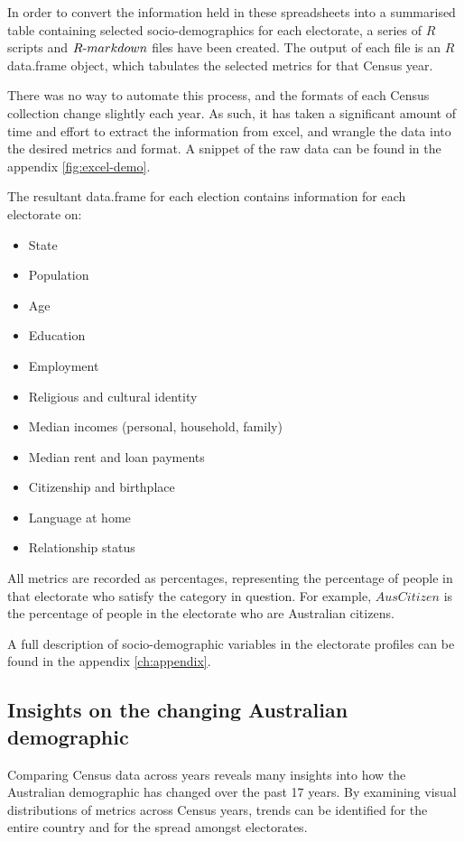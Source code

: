 \documentclass{monashthesis}
\theoremstyle{definition}
\theoremstyle{definition}
\theoremstyle{definition}
\theoremstyle{remark}
\begin{document}
In order to convert the information held in these spreadsheets into a
summarised table containing selected socio-demographics for each
electorate, a series of \(R\) scripts and \(R{\text -}markdown\) files
have been created. The output of each file is an \(R\) data.frame
object, which tabulates the selected metrics for that Census year.

There was no way to automate this process, and the formats of each
Census collection change slightly each year. As such, it has taken a
significant amount of time and effort to extract the information from
excel, and wrangle the data into the desired metrics and format. A
snippet of the raw data can be found in the appendix
\ref{fig:excel-demo}.

The resultant data.frame for each election contains information for each
electorate on:

\begin{itemize}
\item
  State
\item
  Population
\item
  Age
\item
  Education
\item
  Employment
\item
  Religious and cultural identity
\item
  Median incomes (personal, household, family)
\item
  Median rent and loan payments
\item
  Citizenship and birthplace
\item
  Language at home
\item
  Relationship status
\end{itemize}

All metrics are recorded as percentages, representing the percentage of
people in that electorate who satisfy the category in question. For
example, \(AusCitizen\) is the percentage of people in the electorate
who are Australian citizens.

A full description of socio-demographic variables in the electorate
profiles can be found in the appendix \ref{ch:appendix}.

\subsection{Insights on the changing Australian
demographic}\label{insights-on-the-changing-australian-demographic}

Comparing Census data across years reveals many insights into how the
Australian demographic has changed over the past 17 years. By examining
visual distributions of metrics across Census years, trends can be
identified for the entire country and for the spread amongst
electorates.
\end{document}

